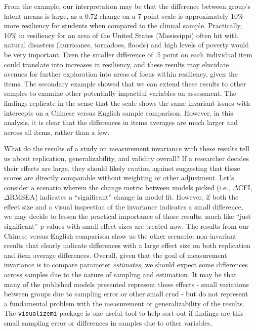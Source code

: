 \documentclass[
  man]{apa7}
\begin{document}
From the example, our interpretation may be that the difference between group's latent means is large, as a 0.72 change on a 7 point scale is approximately 10\% more resiliency for students when compared to the clinical sample. Practically, 10\% in resiliency for an area of the United States (Mississippi) often hit with natural disasters (hurricanes, tornadoes, floods) and high levels of poverty would be very important. Even the smaller difference of .5 point on each individual item could translate into increases in resiliency, and these results may elucidate avenues for further exploration into areas of focus within resiliency, given the items. The secondary example showed that we can extend these results to other samples to examine other potentially impactful variables on assessment. The findings replicate in the sense that the scale shows the same invariant issues with intercepts on a Chinese versus English sample comparison. However, in this analysis, it is clear that the differences in items averages are much larger and across all items, rather than a few.

What do the results of a study on measurement invariance with these results tell us about replication, generalizability, and validity overall? If a researcher decides their effects are large, they should likely caution against suggesting that these scores are directly comparable without weighting or other adjustment. Let's consider a scenario wherein the change metric between models picked (i.e., \(\Delta\)CFI, \(\Delta\)RMSEA) indicates a ``significant'' change in model fit. However, if both the effect size and a visual inspection of the invariance indicates a small difference, we may decide to lessen the practical importance of those results, much like ``just significant'' \emph{p}-values with small effect sizes are treated now. The results from our Chinese versus English comparison show us the other scenario: non-invariant results that clearly indicate differences with a large effect size on both replication and item average differences. Overall, given that the goal of measurement invariance is to compare parameter \emph{estimates}, we should expect some differences across samples due to the nature of sampling and estimation. It may be that many of the published models presented represent these effects - small variations between groups due to sampling error or other small crud - but do not represent a fundamental problem with the measurement or generalizability of the results. The \texttt{visualizemi} package is one useful tool to help sort out if findings are this small sampling error or differences in samples due to other variables.
\end{document}
